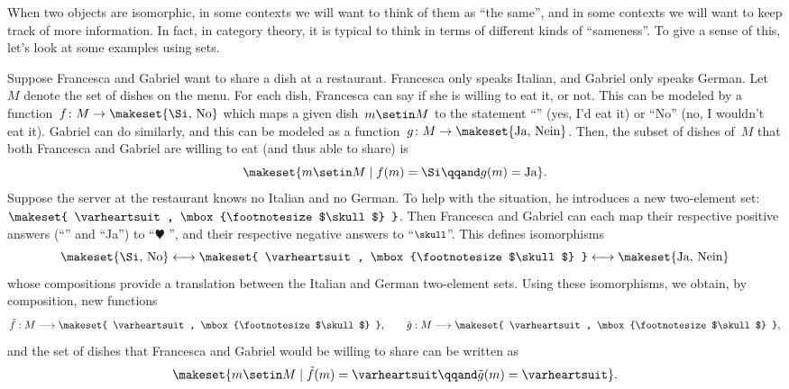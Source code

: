 When two objects are isomorphic, in some contexts we will want to think of them as ``the same'', and in some contexts we will want to keep track of more information.
In fact, in category theory, it is typical to think in terms of different kinds of ``sameness''.
To give a sense of this, let's look at some examples using sets.

\begin{example}
    Suppose Francesca and Gabriel want to share a dish at a restaurant.
    Francesca only speaks Italian, and Gabriel only speaks German.
    Let~$M$ denote the set of dishes on the menu.
    For each dish, Francesca can say if she is willing to eat it, or not.
    This can be modeled by a function~$f\colon M \to \makeset{ \text{\Si, No} }$ which maps a given dish~$m \setin M$ to the statement ``\Si'' (yes, I'd eat it) or ``No'' (no, I wouldn't eat it).
    Gabriel can do similarly, and this can be modeled as a function~$g\colon M \to \makeset{ \text{Ja, Nein} }$.
    Then, the subset of dishes of~$M$ that both Francesca and Gabriel are willing to eat (and thus able to share) is
    \begin{equation*}
        \makeset{ m \setin M \mid f(m) = \text{\Si}  \qqand  g(m) = \text{Ja} }.
    \end{equation*}
    Suppose the server at the restaurant knows no Italian and no German.
    To help with the situation, he introduces a new two-element set: $\makeset{ \varheartsuit, \mbox{\footnotesize $\skull$} }$.
    Then Francesca and Gabriel can each map their respective positive answers (``\Si'' and ``Ja'') to ``$\varheartsuit$ '', and their respective negative answers to ``$\mbox{\footnotesize $\skull$}$''.
    This defines isomorphisms
    \begin{equation*}
        \makeset{ \text{\Si, No} } \longleftrightarrow \makeset{ \varheartsuit, \mbox{\footnotesize $\skull$} } \longleftrightarrow \makeset{ \text{Ja, Nein} }
    \end{equation*}
    whose compositions provide a translation between the Italian and German two-element sets.
    Using these isomorphisms, we obtain, by composition, new functions
    \begin{equation*}
        \tilde f: M \longrightarrow \makeset{ \varheartsuit, \mbox{\footnotesize $\skull$} }, \qquad \tilde g: M \longrightarrow \makeset{ \varheartsuit, \mbox{\footnotesize $\skull$} },
    \end{equation*}
    and the set of dishes that Francesca and Gabriel would be willing to share can be written as
    \begin{equation*}
        \makeset{ m \setin M \mid \tilde f(m) = \varheartsuit \qqand \tilde g(m) = \varheartsuit }.
    \end{equation*}


\end{example}
